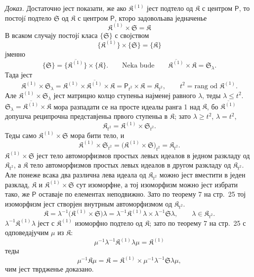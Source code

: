 \documentclass[11pt]{article}
\begin{document}
\emph{Доказ.} Достаточно јест показати, же ако \(\mathfrak K^{(1)}\) јест подтело од \(\mathfrak K\) с центром \(\mathsf P\), то постојí подтело \(\mathfrak S\) од \(\mathfrak K\) с центром \(\mathsf P\), кторо задовольава једначенье
\[
\mathfrak K^{(1)}\times\mathfrak S=\mathfrak K
\]
В всаком случају постојí класа \(\{\mathfrak S\}\) с својством
\[
\{\mathfrak K^{(1)}\}\times\{\mathfrak S\}=\{\mathfrak K\}
\]
јменно
\[
\{\mathfrak S\}=\{\overline{\mathfrak K^{(1)}}\}\times\{\mathfrak K\}.
\qquad
\text{Neka bude}\qquad
\overline{\mathfrak K^{(1)}}\times\mathfrak K=\mathfrak S_\lambda.
\]
Тада јест
\[
\mathfrak K^{(1)}\times\mathfrak S_\lambda
=\mathfrak K^{(1)}\times\overline{\mathfrak K^{(1)}}\times\mathfrak K
=\mathsf P_{t^2}\times\mathfrak K
=\mathfrak K_{t^2},
\qquad
t^2=\text{rang od }\mathfrak K^{(1)}.
\]
Але \(\mathfrak K^{(1)}\times\mathfrak S_\lambda\) јест матрицно колцо ступеньа најменеј равного \(\lambda\), теды \(\lambda\leq t^2\). \(\mathfrak S_\lambda=\overline{\mathfrak K^{(1)}}\times\mathfrak K\) мора разпадати се на просте идеалы ранга 1 над \(\mathfrak K\), бо \(\overline{\mathfrak K^{(1)}}\) допушча реципрочна представјеньа првого ступеньа в \(\mathfrak K\); зато \(\lambda\geq t^2\), \(\lambda=t^2\),
\[
\mathfrak K_{t^2}=\mathfrak K^{(1)}\times\mathfrak S_{t^2}.
\]
Теды само \(\mathfrak K^{(1)}\times\mathfrak S\) мора бити тело, и
\[
\mathfrak K^{(1)}\times\mathfrak S_{t^2}
=\bigl(\mathfrak K^{(1)}\times\mathfrak S\bigr)_{t^2}
=\mathfrak K_{t^2}.
\]
\(\mathfrak K^{(1)}\times\mathfrak S\) јест тело автоморфизмов простых левых идеалов в једном разкладу од \(\mathfrak K_{t^2}\), а \(\mathfrak K\) тело автоморфизмов простых левых идеалов в другом разкладу од \(\mathfrak K_{t^2}\). Але понеже всака два различна лева идеала од \(\mathfrak K_{t^2}\) можно јест вместити в једен разклад, \(\mathfrak K\) и \(\mathfrak K^{(1)}\times\mathfrak S\) сут изоморфне, а тој изоморфизм можно јест избрати тако, же \(\mathsf P\) оставаје по елементах неподвижно. Зато по теорему 7 на стр.~25 тој изоморфизм јест створјен внутрным автоморфизмом од \(\mathfrak K_{t^2}\).
\[
\mathfrak K
=\lambda^{-1}\bigl(\mathfrak K^{(1)}\times\mathfrak S\bigr)\lambda
=\lambda^{-1}\mathfrak K^{(1)}\lambda\times\lambda^{-1}\mathfrak S\lambda,
\qquad
\lambda\in\mathfrak K_{t^2}.
\]
\(\lambda^{-1}\mathfrak K^{(1)}\lambda\) јест с \(\mathfrak K^{(1)}\) изоморфно подтело од \(\mathfrak K\); зато по теорему 7 на стр.~25 с одповедајучим \(\mu\) из \(\mathfrak K\):
\[
\mu^{-1}\lambda^{-1}\mathfrak K^{(1)}\lambda\mu=\mathfrak K^{(1)}
\]
теды
\[
\mu^{-1}\mathfrak K\mu
=\mathfrak K
=\mathfrak K^{(1)}\times\mu^{-1}\lambda^{-1}\mathfrak S\lambda\mu,
\]
чим јест тврдженье доказано.
\end{document}
